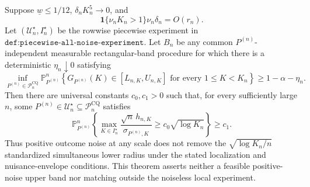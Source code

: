 Suppose \(\underline w\leq1/12\), \(\delta_nK_n^5\to0\), and
\[
 \mathbf1\{\nu_nK_n>1\}\nu_n\delta_n=O(r_n).
\]
Let \((\mathcal U_n^\star,I_n^\star)\) be the rowwise piecewise experiment in \(\texttt{def:piecewise-all-noise-experiment}\).  Let \(B_n\) be any common \(P^{(n)}\)-independent measurable rectangular-band procedure for which there is a deterministic \(\eta_n\downarrow0\) satisfying
\[
 \inf_{P^{(n)}\in\mathcal P_n^{\mathrm{CQ}}}
 \mathbb P_{P^{(n)}}^n\!\left\{G_{P^{(n)}}(K)\in[L_{n,K},U_{n,K}]
 \text{ for every }1\leq K<K_n\right\}\geq1-\alpha-\eta_n.
\]
Then there are universal constants \(c_0,c_1>0\) such that, for every sufficiently large \(n\), some \(P^{(n)}\in\mathcal U_n^\star\subseteq\mathcal P_n^{\mathrm{CQ}}\) satisfies
\[
 \mathbb P_{P^{(n)}}^n\!\left\{
 \max_{K\in I_n^\star}\frac{\sqrt n\,h_{n,K}}{\sigma_{P^{(n)},K}}
 \geq c_0\sqrt{\log K_n}\right\}\geq c_1.
\]
Thus positive outcome noise at any scale does not remove the \(\sqrt{\log K_n/n}\) standardized simultaneous lower radius under the stated localization and nuisance-envelope conditions.  This theorem asserts neither a feasible positive-noise upper band nor matching outside the noiseless local experiment.